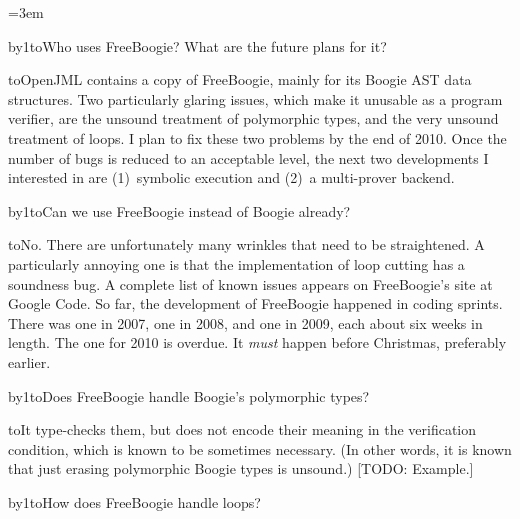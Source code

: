 \parindent=3em
\def\dts{\mathinner{\ldotp\ldotp}}
\def\para#1{\noindent\hbox to\parindent{\hss\bf#1 }}
\newcount\qcnt{}
\def\A{\medskip\para{A\number\qcnt:}}
\def\Q{\bigskip{}\advance\qcnt by1\para{Q\number\qcnt:}}
\def\limp{\Rightarrow}

\Q Who uses FreeBoogie? What are the future plans for it?

\A OpenJML contains a copy of FreeBoogie, mainly for its Boogie AST data
structures. Two particularly glaring issues, which make it unusable as a
program verifier, are the unsound treatment of polymorphic types, and the
very unsound treatment of loops. I plan to fix these two problems by the
end of 2010. Once the number of bugs is reduced to an acceptable level, the
next two developments I interested in are (1)~symbolic execution and (2)~a
multi-prover backend.

\Q Can we use FreeBoogie instead of Boogie already?

\A No. There are unfortunately many wrinkles that need to be straightened.
A particularly annoying one is that the implementation of loop cutting has
a soundness bug. A complete list of known issues appears on FreeBoogie's
site at Google Code. So far, the development of FreeBoogie happened in
coding sprints. There was one in 2007, one in 2008, and one in 2009, each
about six weeks in length. The one for 2010 is overdue. It {\it must\/}
happen before Christmas, preferably earlier.

\Q Does FreeBoogie handle Boogie's polymorphic types?

\A It type-checks them, but does not encode their meaning in the
verification condition, which is known to be sometimes necessary. (In other
words, it is known that just erasing polymorphic Boogie types is unsound.)
[TODO: Example.]

\Q How does FreeBoogie handle loops?

